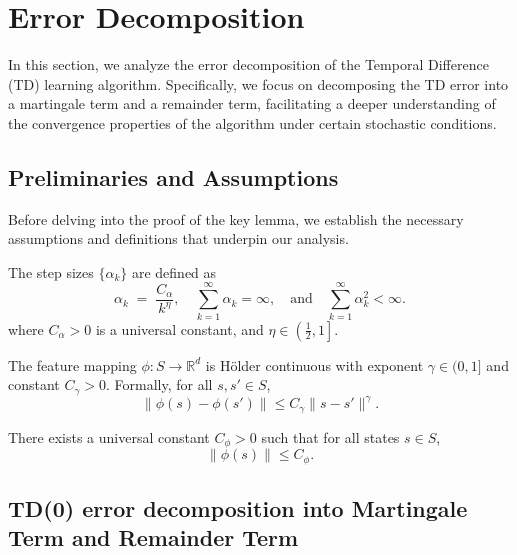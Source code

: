 \section{Error Decomposition}
\label{sec:error-decomposition}

In this section, we analyze the error decomposition of the Temporal Difference (TD) learning algorithm. Specifically, we focus on decomposing the TD error into a martingale term and a remainder term, facilitating a deeper understanding of the convergence properties of the algorithm under certain stochastic conditions.

\subsection{Preliminaries and Assumptions}

Before delving into the proof of the key lemma, we establish the necessary assumptions and definitions that underpin our analysis.

\begin{assumption}
\label{ass:step-size-decay}
The step sizes \(\{\alpha_k\}\) are defined as
\[
\alpha_k \;=\; \frac{C_\alpha}{k^\eta},\quad\sum_{k=1}^{\infty} \alpha_k = \infty,
\quad\text{and}\quad
\sum_{k=1}^{\infty} \alpha_k^2 < \infty.
\]
where \(C_\alpha > 0\) is a universal constant, and \(\eta \in \left(\tfrac{1}{2},1\right]\).
\end{assumption}

\begin{assumption}
\label{ass:holder-continuous-features}
The feature mapping \( \phi: S \to \mathbb{R}^d \) is Hölder continuous with exponent \( \gamma \in (0, 1] \) and constant \( C_\gamma > 0 \). Formally, for all \( s, s' \in S \),
\[
\|\phi(s) - \phi(s')\| \leq C_\gamma \|s - s'\|^\gamma.
\]
\end{assumption}

\begin{assumption}
\label{ass:bounded-features}
There exists a universal constant \(C_\phi > 0\) such that for all states \(s \in S\),
\[
\|\phi(s)\| \leq C_\phi.
\]
\end{assumption}

\subsection{TD(0) error decomposition into Martingale Term and Remainder Term}

